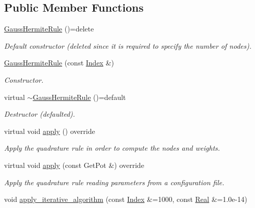 \subsection*{Public Member Functions}
\begin{DoxyCompactItemize}
\item 
\hypertarget{classGaussHermiteRule_a82318908e412ac924a27d7c816c5e89d}{\hyperlink{classGaussHermiteRule_a82318908e412ac924a27d7c816c5e89d}{Gauss\-Hermite\-Rule} ()=delete}\label{classGaussHermiteRule_a82318908e412ac924a27d7c816c5e89d}

\begin{DoxyCompactList}\small\item\em Default constructor (deleted since it is required to specify the number of nodes). \end{DoxyCompactList}\item 
\hyperlink{classGaussHermiteRule_a650e19b8ef2851cdc955a1201b76f9b5}{Gauss\-Hermite\-Rule} (const \hyperlink{typedefs_8h_a2c726f8f32697958e9d6c2afecda531d}{Index} \&)
\begin{DoxyCompactList}\small\item\em Constructor. \end{DoxyCompactList}\item 
\hypertarget{classGaussHermiteRule_ade51ec8543da3071631a6e1dbf1ac9f7}{virtual \hyperlink{classGaussHermiteRule_ade51ec8543da3071631a6e1dbf1ac9f7}{$\sim$\-Gauss\-Hermite\-Rule} ()=default}\label{classGaussHermiteRule_ade51ec8543da3071631a6e1dbf1ac9f7}

\begin{DoxyCompactList}\small\item\em Destructor (defaulted). \end{DoxyCompactList}\item 
\hypertarget{classGaussHermiteRule_ae5502fed0f3128dce83d1280a834ffac}{virtual void \hyperlink{classGaussHermiteRule_ae5502fed0f3128dce83d1280a834ffac}{apply} () override}\label{classGaussHermiteRule_ae5502fed0f3128dce83d1280a834ffac}

\begin{DoxyCompactList}\small\item\em Apply the quadrature rule in order to compute the nodes and weights. \end{DoxyCompactList}\item 
virtual void \hyperlink{classGaussHermiteRule_a6265ae995213bef29d216da947f5f692}{apply} (const Get\-Pot \&) override
\begin{DoxyCompactList}\small\item\em Apply the quadrature rule reading parameters from a configuration file. \end{DoxyCompactList}\item 
\hypertarget{classGaussHermiteRule_a5a21a96592fcd473df6739c72c083063}{void \hyperlink{classGaussHermiteRule_a5a21a96592fcd473df6739c72c083063}{apply\-\_\-iterative\-\_\-algorithm} (const \hyperlink{typedefs_8h_a2c726f8f32697958e9d6c2afecda531d}{Index} \&=1000, const \hyperlink{typedefs_8h_a060b837c3b4486ee35317744156f3da2}{Real} \&=1.\-0e-\/14)}\label{classGaussHermiteRule_a5a21a96592fcd473df6739c72c083063}


\end{DoxyCompactItemize}
